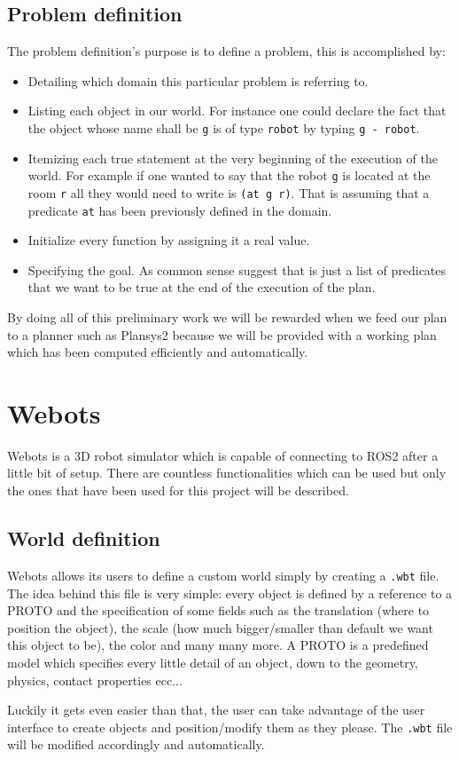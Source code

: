 \subsection{Problem definition} The problem definition's purpose is to define a problem, this is accomplished by:
\begin{itemize}
    \item Detailing which domain this particular problem is referring to.
    \item Listing each object in our world. For instance one could declare the fact that the object whose name shall be \texttt{g} is of type \texttt{robot} by typing \texttt{g - robot}.
    \item Itemizing each true statement at the very beginning of the execution of the world. For example if one wanted to say that the robot \texttt{g} is located at the room \texttt{r} all they would need to write is \texttt{(at g r)}. That is assuming that a predicate \texttt{at} has been previously defined in the domain.
    \item Initialize every function by assigning it a real value.
    \item Specifying the goal. As common sense suggest that is just a list of predicates that we want to be true at the end of the execution of the plan.
\end{itemize}
By doing all of this preliminary work we will be rewarded when we feed our plan to a planner such as Plansys2 because we will be provided with a working plan which has been computed efficiently and automatically.
\cite{pddl_docs}
\section{Webots}
Webots is a 3D robot simulator which is capable of connecting to ROS2 after a little bit of setup. There are countless functionalities which can be used but only the ones that have been used for this project will be described. 
\subsection{World definition} Webots allows its users to define a custom world simply by creating a \texttt{.wbt} file. The idea behind this file is very simple: every object is defined by a reference to a PROTO and the specification of some fields such as the translation (where to position the object), the scale (how much bigger/smaller than default we want this object to be), the color and many many more. A PROTO is a predefined model which specifies every little detail of an object, down to the geometry, physics, contact properties ecc... 
\par
Luckily it gets even easier than that, the user can take advantage of the user interface to create objects and position/modify them as they please. The \texttt{.wbt} file will be modified accordingly and automatically.
